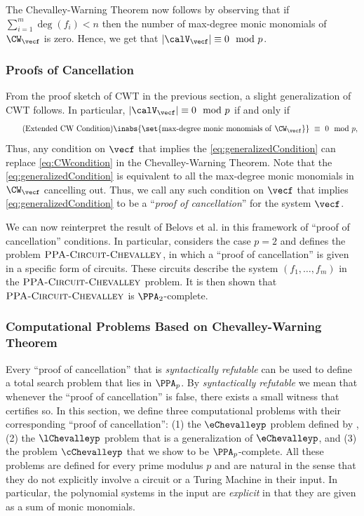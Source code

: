 \noindent The Chevalley-Warning Theorem now follows by observing that if $\sum_{i = 1}^m \deg(f_i) < n$ then the number of max-degree monic monomials of $\CW_{\vecf}$ is zero. Hence, we get that $|\calV_{\vecf}| \equiv 0 \mod{p}$.

\subsubsection{Proofs of Cancellation}
\label{sec:proofsOfCancellation}

  From the proof sketch of CWT in the previous section, a slight generalization of CWT follows. In particular, $|\calV_{\vecf}| \equiv 0 \mod{p}$ if and only if
\begin{equation}
	\tag{Extended CW Condition}
	\inabs{\set{\mathrm{max\text{-}degree~monic~monomials~of~} \CW_{\vecf}}} ~\equiv~ 0 \mod{p},
		\label{eq:generalizedCondition}
\end{equation}
Thus, any condition on $\vecf$ that implies the \eqref{eq:generalizedCondition} can
 replace \eqref{eq:CWcondition} in the Chevalley-Warning
Theorem. Note that the \eqref{eq:generalizedCondition} is equivalent to all the max-degree monic monomials in $\CW_{\vecf}$ cancelling out.
Thus, we call any such condition on $\vecf$ that implies \eqref{eq:generalizedCondition} to be a
``\textit{proof of cancellation}'' for the system $\vecf$.

We can now reinterpret the result of Belovs et
al. \cite{r8} in this framework of ``proof of cancellation'' conditions. In particular, \cite{r8} considers the
case $p = 2$ and defines the problem $\textsc{PPA-Circuit-Chevalley}$, in which a ``proof of
cancellation'' is given in a specific form of circuits. These circuits describe the
system $(f_1, \ldots, f_m)$ in the $\textsc{PPA-Circuit-Chevalley}$ problem. It is then shown that $\textsc{PPA-Circuit-Chevalley}$ is $\PPA_2$-complete.


\subsubsection{Computational Problems Based on Chevalley-Warning Theorem}
\label{sec:computationalChevalleyWarning}

  Every ``proof of cancellation'' that is \textit{syntactically refutable} can be used to define
  a total search problem that lies in $\PPA_p$. By {\em syntactically refutable} we mean that whenever the
  ``proof of cancellation'' is false, there exists a small witness that certifies so. In this
  section, we define three computational problems with their corresponding ``proof of
  cancellation'': (1) the $\eChevalleyp$ problem defined by \cite{r33}, (2) the
  $\lChevalleyp$ problem that is a generalization of $\eChevalleyp$, and (3) the problem
  $\cChevalleyp$ that we show to be $\PPA_p$-complete. All these problems are
  defined for every prime modulus $p$ and are natural in the sense that they do not explicitly
  involve a circuit or a Turing Machine in their input. In particular, the polynomial systems in the input are {\em explicit} in that they are given as a sum of monic monomials. \bigskip

